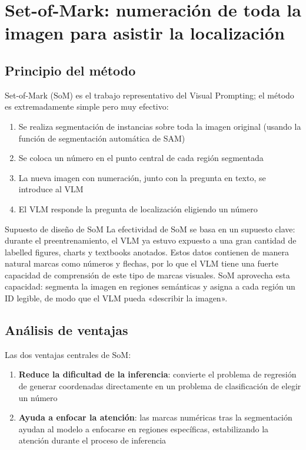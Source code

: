 \section{Set-of-Mark: numeración de toda la imagen para asistir la localización}

\subsection{Principio del método}

Set-of-Mark (SoM) es el trabajo representativo del Visual Prompting; el método es extremadamente simple pero muy efectivo:

\begin{enumerate}
    \item Se realiza segmentación de instancias sobre toda la imagen original (usando la función de segmentación automática de SAM)
    \item Se coloca un número en el punto central de cada región segmentada
    \item La nueva imagen con numeración, junto con la pregunta en texto, se introduce al VLM
    \item El VLM responde la pregunta de localización eligiendo un número
\end{enumerate}

\begin{importantbox}{Supuesto de diseño de SoM}
La efectividad de SoM se basa en un supuesto clave: durante el preentrenamiento, el VLM ya estuvo expuesto a una gran cantidad de labelled figures, charts y textbooks anotados. Estos datos contienen de manera natural marcas como números y flechas, por lo que el VLM tiene una fuerte capacidad de comprensión de este tipo de marcas visuales. SoM aprovecha esta capacidad: segmenta la imagen en regiones semánticas y asigna a cada región un ID legible, de modo que el VLM pueda «describir la imagen».
\end{importantbox}

\subsection{Análisis de ventajas}

Las dos ventajas centrales de SoM:

\begin{enumerate}
    \item \textbf{Reduce la dificultad de la inferencia}: convierte el problema de regresión de generar coordenadas directamente en un problema de clasificación de elegir un número
    \item \textbf{Ayuda a enfocar la atención}: las marcas numéricas tras la segmentación ayudan al modelo a enfocarse en regiones específicas, estabilizando la atención durante el proceso de inferencia
\end{enumerate}

